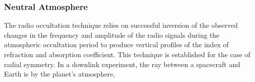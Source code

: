 \documentclass{article}
\theoremstyle{mystyle}
\begin{document}
\subsubsection{\footnotesize Neutral Atmosphere}

The radio \gls{occultation} technique relies on successful inversion of the observed changes in the \gls{frequency} and \gls{amplitude} of the radio signals during the atmospheric \gls{occultation} period to produce vertical profiles of the \gls{index of refraction} and \gls{absorption coefficient}. This technique is established for the case of radial symmetry. In a  \gls{downlink} experiment, the ray between a spacecraft and Earth is  by the planet's \gls{atmosphere}, 
\end{document}
